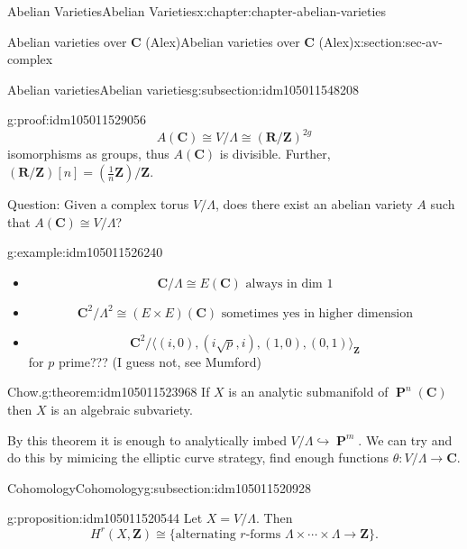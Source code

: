 \documentclass[oneside,10pt,]{book}
\numberwithin{equation}{section}
\newcommand{\lb}{[}
\newcommand{\rb}{]}
\newcommand{\ZZ}{\mathbf{Z}}
\newcommand{\RR}{\mathbf{R}}
\newcommand{\CC}{\mathbf{C}}
\DeclareMathOperator{\PP}{\mathbf{P}}
\begin{document}
\begin{chapterptx}{Abelian Varieties}{}{Abelian Varieties}{}{}{x:chapter:chapter-abelian-varieties}
\begin{sectionptx}{Abelian varieties over \(\CC\) (Alex)}{}{Abelian varieties over \(\CC\) (Alex)}{}{}{x:section:sec-av-complex}
\begin{subsectionptx}{Abelian varieties}{}{Abelian varieties}{}{}{g:subsection:idm105011548208}
\begin{proofptx}{}{g:proof:idm105011529056}
%
\begin{equation*}
A(\CC)  \cong V/\Lambda \cong (\RR/\ZZ)^{2g}
\end{equation*}
isomorphisms as groups, thus \(A(\CC)\) is divisible. Further, \((\RR/\ZZ)\lb n \rb = (\frac 1n \ZZ)/\ZZ\).%
\end{proofptx}
Question: Given a complex torus \(V/\Lambda\), does there exist an abelian variety \(A\) such that \(A(\CC) \cong V/\Lambda\)?%
\begin{example}{}{g:example:idm105011526240}%
%
\begin{itemize}[label=\textbullet]
\item{}%
\begin{equation*}
\CC/\Lambda \cong E(\CC) \text{ always in dim 1}
\end{equation*}
%
\item{}%
\begin{equation*}
\CC^2/\Lambda^2 \cong (E\times E)(\CC) \text{ sometimes yes in higher dimension}
\end{equation*}
%
\item{}%
\begin{equation*}
\CC^2/\langle (i, 0), (i\sqrt p, i), (1, 0), (0, 1)\rangle_\ZZ
\end{equation*}
for \(p\) prime??? (I guess not, see Mumford)%
\end{itemize}
%
\end{example}
\begin{theorem}{Chow.}{}{g:theorem:idm105011523968}%
If \(X\) is an analytic submanifold of \(\PP^n(\CC)\) then \(X\) is an algebraic subvariety.%
\end{theorem}
By this theorem it is enough to analytically imbed \(V/\Lambda \hookrightarrow \PP^m\). We can try and do this by mimicing the elliptic curve strategy, find enough functions \(\theta \colon V/\Lambda \to \CC\).%
\end{subsectionptx}
%
%
\typeout{************************************************}
\typeout{************************************************}
%
\begin{subsectionptx}{Cohomology}{}{Cohomology}{}{}{g:subsection:idm105011520928}
\begin{proposition}{}{}{g:proposition:idm105011520544}%
Let \(X = V/\Lambda\). Then%
\begin{equation*}
H^r (X,\ZZ) \cong \{\text{alternating }r\text{-forms } \Lambda\times\cdots\times\Lambda\to \ZZ\}\text{.}
\end{equation*}

\end{proposition}
\end{subsectionptx}
\end{sectionptx}
\end{chapterptx}
\end{document}
